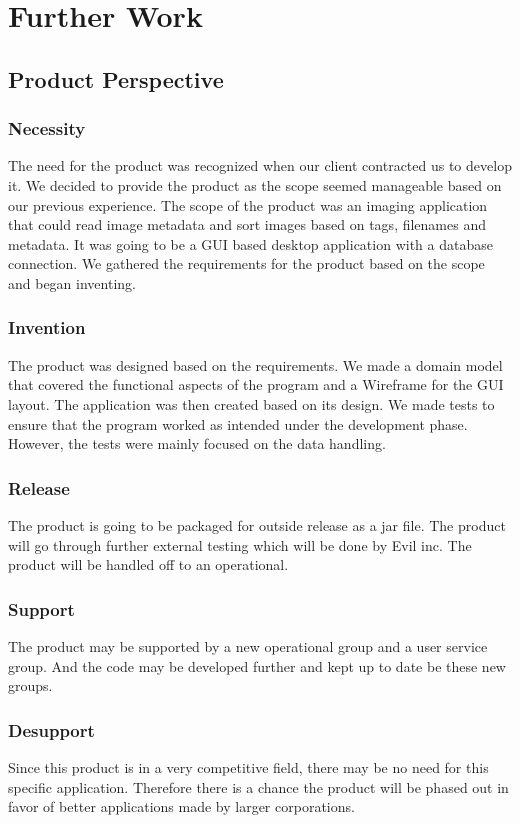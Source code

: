\section{Further Work}

\subsection{Product Perspective}
\subsubsection{Necessity}
The need for the product was recognized when our client contracted us to develop it. We decided to provide the product as the scope seemed manageable based on our previous experience. The scope of the product was an imaging application that could read image metadata and sort images based on tags, filenames and metadata. It was going to be a GUI based desktop application with a database connection. We gathered the requirements for the product based on the scope and began inventing.

\subsubsection{Invention}
The product was designed based on the requirements. We made a domain model that covered the functional aspects of the program and a Wireframe for the GUI layout. The application was then created based on its design. We made tests to ensure that the program worked as intended under the development phase. However, the tests were mainly focused on the data handling. 

\subsubsection{Release}
The product is going to be packaged for outside release as a jar file. The product will go through further external testing which will be done by Evil inc. The product will be handled off to an operational.

\subsubsection{Support}
The product may be supported by a new operational group and a user service group. And the code may be developed further and kept up to date be these new groups.

\subsubsection{Desupport}
Since this product is in a very competitive field, there may be no need for this specific application. Therefore there is a chance the product will be phased out in favor of better applications made by larger corporations. 


